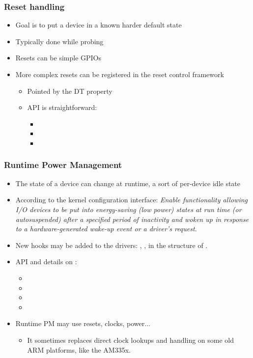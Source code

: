 \begin{frame}
  \frametitle{Reset handling}
  \begin{itemize}
  \item Goal is to put a device in a known harder default state
  \item Typically done while probing
  \item Resets can be simple GPIOs
  \item More complex resets can be registered in the reset control framework
    \begin{itemize}
    \item Pointed by the  DT property
    \item API is straightforward:
      \begin{itemize}
      \item {}
      \item {}
      \item {}
      \end{itemize}
    \end{itemize}
  \end{itemize}
\end{frame}

\begin{frame}
  \frametitle{Runtime Power Management}
  \begin{itemize}
  \item The state of a device can change at runtime, a sort of
    per-device idle state
  \item According to the kernel configuration interface: \emph{Enable
      functionality allowing I/O devices to be put into energy-saving
      (low power) states at run time (or autosuspended) after a
      specified period of inactivity and woken up in response to a
      hardware-generated wake-up event or a driver's request.}
  \item New hooks may be added to the drivers:
    , ,
     in the 
    structure of .
  \item API and details on :
    \begin{itemize}
    \item {}
    \item {}
    \item {}
    \item {}
    \end{itemize}
  \item Runtime PM may use resets, clocks, power...
    \begin{itemize}
    \item It sometimes replaces direct clock lookups and handling on some old
      ARM platforms, like the AM335x.
    \end{itemize}
  \end{itemize}
\end{frame}

